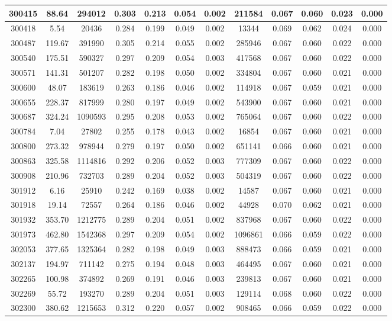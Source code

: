 \documentclass[10pt]{extarticle}
\begin{document}
\begin{longtable}{|c|c|c|c|c|c|c|c|c|c|c|c|}
\hline 
300415&88.64&294012&0.303&0.213&0.054&0.002&211584&0.067&0.060&0.023&0.000 \\ 
\hline 
300418&5.54&20436&0.284&0.199&0.049&0.002&13344&0.069&0.062&0.024&0.000 \\ 
\hline 
300487&119.67&391990&0.305&0.214&0.055&0.002&285946&0.067&0.060&0.022&0.000 \\ 
\hline 
300540&175.51&590327&0.297&0.209&0.054&0.003&417568&0.067&0.060&0.022&0.000 \\ 
\hline 
300571&141.31&501207&0.282&0.198&0.050&0.002&334804&0.067&0.060&0.021&0.000 \\ 
\hline 
300600&48.07&183619&0.263&0.186&0.046&0.002&114918&0.067&0.059&0.021&0.000 \\ 
\hline 
300655&228.37&817999&0.280&0.197&0.049&0.002&543900&0.067&0.060&0.021&0.000 \\ 
\hline 
300687&324.24&1090593&0.295&0.208&0.053&0.002&765064&0.067&0.060&0.022&0.000 \\ 
\hline 
300784&7.04&27802&0.255&0.178&0.043&0.002&16854&0.067&0.060&0.021&0.000 \\ 
\hline 
300800&273.32&978944&0.279&0.197&0.050&0.002&651141&0.066&0.060&0.021&0.000 \\ 
\hline 
300863&325.58&1114816&0.292&0.206&0.052&0.003&777309&0.067&0.060&0.022&0.000 \\ 
\hline 
300908&210.96&732703&0.289&0.204&0.052&0.003&504319&0.067&0.060&0.022&0.000 \\ 
\hline 
301912&6.16&25910&0.242&0.169&0.038&0.002&14587&0.067&0.060&0.021&0.000 \\ 
\hline 
301918&19.14&72557&0.264&0.186&0.046&0.002&44928&0.070&0.062&0.021&0.000 \\ 
\hline 
301932&353.70&1212775&0.289&0.204&0.051&0.002&837968&0.067&0.060&0.022&0.000 \\ 
\hline 
301973&462.80&1542368&0.297&0.209&0.054&0.002&1096861&0.066&0.059&0.022&0.000 \\ 
\hline 
302053&377.65&1325364&0.282&0.198&0.049&0.003&888473&0.066&0.059&0.021&0.000 \\ 
\hline 
302137&194.97&711142&0.275&0.194&0.048&0.003&464495&0.067&0.060&0.021&0.000 \\ 
\hline 
302265&100.98&374892&0.269&0.191&0.046&0.003&239813&0.067&0.060&0.021&0.000 \\ 
\hline 
302269&55.72&193270&0.289&0.204&0.051&0.003&129114&0.068&0.060&0.022&0.000 \\ 
\hline 
302300&380.62&1215653&0.312&0.220&0.057&0.002&908465&0.066&0.059&0.022&0.000 \\ 

\end{longtable}
\end{document}
